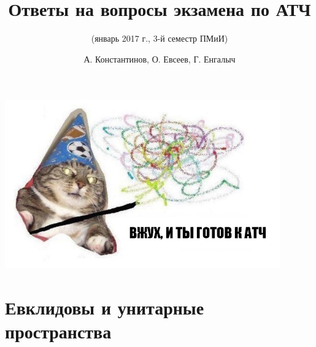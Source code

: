 \documentclass{scrartcl}
\title{Ответы на вопросы экзамена по АТЧ}
\subtitle{(январь 2017 г., 3-й семестр ПМиИ)}
\author{А. Константинов, О. Евсеев, Г. Енгалыч}
\begin{document}
    \thispagestyle{empty}
    \maketitle
    
    \begin{center}
        \vspace{120pt}
        \includegraphics[width=32em]{cat.png}
    \end{center}    

    \setcounter{part}{8}
    
    \part{Евклидовы и унитарные пространства}
    
    
\end{document}
